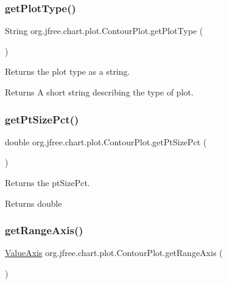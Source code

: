 \subsubsection{\texorpdfstring{get\+Plot\+Type()}{getPlotType()}}
{\footnotesize\ttfamily String org.\+jfree.\+chart.\+plot.\+Contour\+Plot.\+get\+Plot\+Type (\begin{DoxyParamCaption}{ }\end{DoxyParamCaption})}

Returns the plot type as a string.

\begin{DoxyReturn}{Returns}
A short string describing the type of plot. 
\end{DoxyReturn}
\mbox{\label{classorg_1_1jfree_1_1chart_1_1plot_1_1_contour_plot_a97a8768596d5ba1fb2c4e3da782b2485}} 
\subsubsection{\texorpdfstring{get\+Pt\+Size\+Pct()}{getPtSizePct()}}
{\footnotesize\ttfamily double org.\+jfree.\+chart.\+plot.\+Contour\+Plot.\+get\+Pt\+Size\+Pct (\begin{DoxyParamCaption}{ }\end{DoxyParamCaption})}

Returns the pt\+Size\+Pct. \begin{DoxyReturn}{Returns}
double 
\end{DoxyReturn}
\mbox{\label{classorg_1_1jfree_1_1chart_1_1plot_1_1_contour_plot_a83069c74a069e51d8464523e02d14d23}} 
\subsubsection{\texorpdfstring{get\+Range\+Axis()}{getRangeAxis()}}
{\footnotesize\ttfamily \mbox{\hyperlink{classorg_1_1jfree_1_1chart_1_1axis_1_1_value_axis}{Value\+Axis}} org.\+jfree.\+chart.\+plot.\+Contour\+Plot.\+get\+Range\+Axis (\begin{DoxyParamCaption}{ }\end{DoxyParamCaption})}

